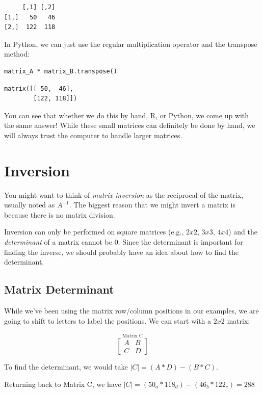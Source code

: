 \documentclass[
  letterpaper,
]{krantz}
\begin{document}
\begin{verbatim}
     [,1] [,2]
[1,]   50   46
[2,]  122  118
\end{verbatim}

In Python, we can just use the regular multiplication operator and the
transpose method:

\begin{verbatim}
matrix_A * matrix_B.transpose()
\end{verbatim}

\begin{verbatim}
matrix([[ 50,  46],
        [122, 118]])
\end{verbatim}

You can see that whether we do this by hand, R, or Python, we come up
with the same answer! While these small matrices can definitely be done
by hand, we will always trust the computer to handle larger matrices.

\section{Inversion}\label{inversion}

You might want to think of \emph{matrix inversion} as the reciprocal of
the matrix, usually noted as \(A^{-1}\). The biggest reason that we
might invert a matrix is because there is no matrix division.

Inversion can only be performed on square matrices (e.g., \(2x2\),
\(3x3\), \(4x4\)) and the \emph{determinant} of a matrix cannot be 0.
Since the determinant is important for finding the inverse, we should
probably have an idea about how to find the determinant.

\subsection{Matrix Determinant}\label{matrix-determinant}

While we've been using the matrix row/column positions in our examples,
we are going to shift to letters to label the positions. We can start
with a \(2x2\) matrix:

\[
\stackrel{\mbox{Matrix C}}{
\begin{bmatrix}
A & B\\
C & D
\end{bmatrix}
}
\]

To find the determinant, we would take \(\mid C \mid = (A*D) - (B*C)\).

Returning back to Matrix C, we have
\(\mid C \mid = (50_a*118_d) - (46_b*122_c) = 288\)
\end{document}
